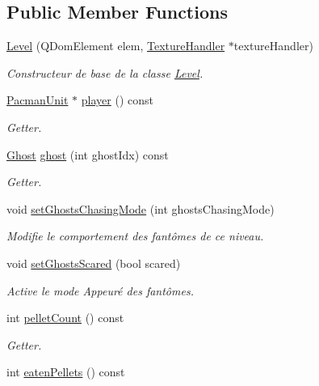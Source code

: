 \subsection*{Public Member Functions}
\begin{DoxyCompactItemize}
\item 
\hyperlink{class_level_ae03897e1ca36f7f22c6a071b105e6376}{Level} (Q\+Dom\+Element elem, \hyperlink{class_texture_handler}{Texture\+Handler} $\ast$texture\+Handler)
\begin{DoxyCompactList}\small\item\em Constructeur de base de la classe \hyperlink{class_level}{Level}. \end{DoxyCompactList}\item 
\hyperlink{class_pacman_unit}{Pacman\+Unit} $\ast$ \hyperlink{class_level_afdd877e4e92747abb3718060e77b9cd6}{player} () const 
\begin{DoxyCompactList}\small\item\em Getter. \end{DoxyCompactList}\item 
\hyperlink{class_ghost}{Ghost} \hyperlink{class_level_afe5a9cb5dc0a1f56b5e491298abfc5c5}{ghost} (int ghost\+Idx) const 
\begin{DoxyCompactList}\small\item\em Getter. \end{DoxyCompactList}\item 
void \hyperlink{class_level_a90eaf5382cf0c6a31c0db006644b798c}{set\+Ghosts\+Chasing\+Mode} (int ghosts\+Chasing\+Mode)
\begin{DoxyCompactList}\small\item\em Modifie le comportement des fantômes de ce niveau. \end{DoxyCompactList}\item 
void \hyperlink{class_level_a4ba3695094e42f46ed7af0f489e36b15}{set\+Ghosts\+Scared} (bool scared)
\begin{DoxyCompactList}\small\item\em Active le mode Appeuré des fantômes. \end{DoxyCompactList}\item 
int \hyperlink{class_level_a05f5d955db2a800d9073d5cd9159d6f7}{pellet\+Count} () const 
\begin{DoxyCompactList}\small\item\em Getter. \end{DoxyCompactList}\item 
int \hyperlink{class_level_a22e230e7ff4e40ae092534caafda9060}{eaten\+Pellets} () const 

\end{DoxyCompactItemize}
